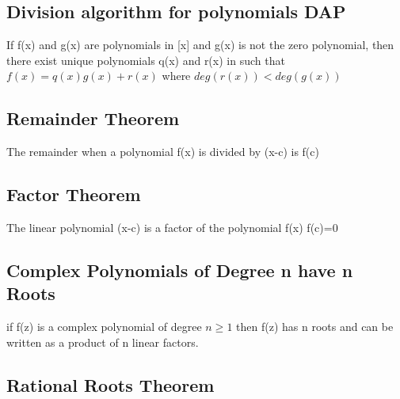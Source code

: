 \documentclass[12pt]{article}
\begin{document}
\subsection{Division algorithm for polynomials DAP}
If f(x) and g(x) are polynomials in [x] and g(x) is not the zero
polynomial, then there exist unique polynomials q(x) and r(x) in 
such that $f(x)=q(x)g(x) +r(x)$ where $deg(r(x))<deg(g(x))$
\subsection{Remainder Theorem}
The remainder when a polynomial f(x) is divided by (x-c) is f(c)
\subsection{Factor Theorem}
The linear polynomial (x-c) is a factor of the polynomial f(x) \iff f(c)=0
\subsection{Complex Polynomials of Degree n have n Roots}
if f(z) is a complex polynomial of degree $n\geq1$ then f(z) has n roots and
can be written as a product of n linear factors.
\subsection{Rational Roots Theorem}
\end{document}
